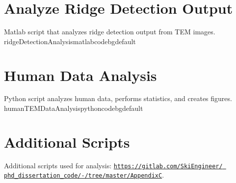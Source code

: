 \documentclass[../Dissertation]{subfiles}
\begin{document}
\section{Analyze Ridge Detection Output}
    {}
    {Matlab script that analyzes ridge detection output from TEM images.}
    {ridgeDetectionAnalysis}{\footnotesize}{matlabcodebg}{default}
    
\section{Human Data Analysis}
    {}
    {Python script analyzes human data, performs statistics, and creates
    figures.}
    {humanTEMDataAnalysis}{\footnotesize}{pythoncodebg}{default}
    
\section{Additional Scripts}
    Additional scripts used for analysis:
\href{http://gitlab.com/SkiEngineer/phd_dissertation_code/-/tree/master/AppendixB}
    {\texttt{https://gitlab.com/SkiEngineer/\linebreak
    phd\_dissertation\_code/-/tree/master/AppendixC}}.
    
\end{document}
